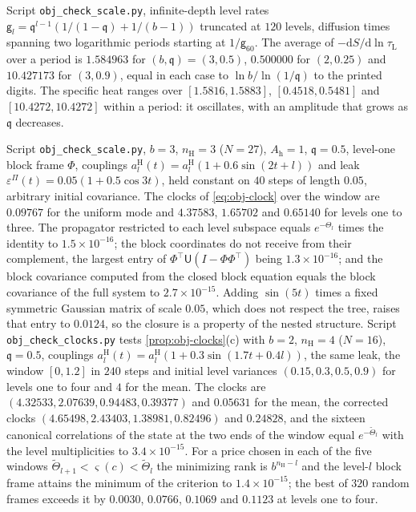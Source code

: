 \begin{numcheck}\label{chk:obj-specific-heat}
Script \texttt{obj\_\allowbreak check\_\allowbreak scale.py}, infinite-depth level rates $\mathsf g_l=\mathfrak q^{l-1}(1/(1-\mathfrak q)+1/(b-1))$ truncated at $120$ levels, diffusion times spanning two logarithmic periods starting at $1/\mathsf g_{60}$. The average of $-\mathrm dS/\mathrm d\ln\tau_{\mathrm L}$ over a period is $1.584963$ for $(b,\mathfrak q)=(3,0.5)$, $0.500000$ for $(2,0.25)$ and $10.427173$ for $(3,0.9)$, equal in each case to $\ln b/\ln(1/\mathfrak q)$ to the printed digits. The specific heat ranges over $[1.5816,1.5883]$, $[0.4518,0.5481]$ and $[10.4272,10.4272]$ within a period: it oscillates, with an amplitude that grows as $\mathfrak q$ decreases.
\end{numcheck}

\begin{numcheck}\label{chk:obj-clocks}
Script \texttt{obj\_\allowbreak check\_\allowbreak scale.py}, $b=3$, $n_{\mathrm H}=3$ ($N=27$), $A_{\mathrm h}=1$, $\mathfrak q=0.5$, level-one block frame $\Phi$, couplings $a^{\mathrm H}_l(t)=a^{\mathrm H}_l(1+0.6\sin(2t+l))$ and leak $\varepsilon^\Pi(t)=0.05(1+0.5\cos3t)$, held constant on $40$ steps of length $0.05$, arbitrary initial covariance. The clocks of \eqref{eq:obj-clock} over the window are $0.09767$ for the uniform mode and $4.37583$, $1.65702$ and $0.65140$ for levels one to three. The propagator restricted to each level subspace equals $e^{-\Theta_l}$ times the identity to $1.5\times10^{-16}$; the block coordinates do not receive from their complement, the largest entry of $\Phi^\top\mathsf U(I-\Phi\Phi^\top)$ being $1.3\times10^{-16}$; and the block covariance computed from the closed block equation equals the block covariance of the full system to $2.7\times10^{-15}$. Adding $\sin(5t)$ times a fixed symmetric Gaussian matrix of scale $0.05$, which does not respect the tree, raises that entry to $0.0124$, so the closure is a property of the nested structure. Script \texttt{obj\_\allowbreak check\_\allowbreak clocks.py} tests \cref{prop:obj-clocks}(c) with $b=2$, $n_{\mathrm H}=4$ ($N=16$), $\mathfrak q=0.5$, couplings $a^{\mathrm H}_l(t)=a^{\mathrm H}_l(1+0.3\sin(1.7t+0.4l))$, the same leak, the window $[0,1.2]$ in $240$ steps and initial level variances $(0.15,0.3,0.5,0.9)$ for levels one to four and $4$ for the mean. The clocks are $(4.32533,2.07639,0.94483,0.39377)$ and $0.05631$ for the mean, the corrected clocks $(4.65498,2.43403,1.38981,0.82496)$ and $0.24828$, and the sixteen canonical correlations of the state at the two ends of the window equal $e^{-\tilde\Theta_l}$ with the level multiplicities to $3.4\times10^{-15}$. For a price chosen in each of the five windows $\tilde\Theta_{l+1}<\varsigma(c)<\tilde\Theta_l$ the minimizing rank is $b^{n_{\mathrm H}-l}$ and the level-$l$ block frame attains the minimum of the criterion to $1.4\times10^{-15}$; the best of $320$ random frames exceeds it by $0.0030$, $0.0766$, $0.1069$ and $0.1123$ at levels one to four.
\end{numcheck}
